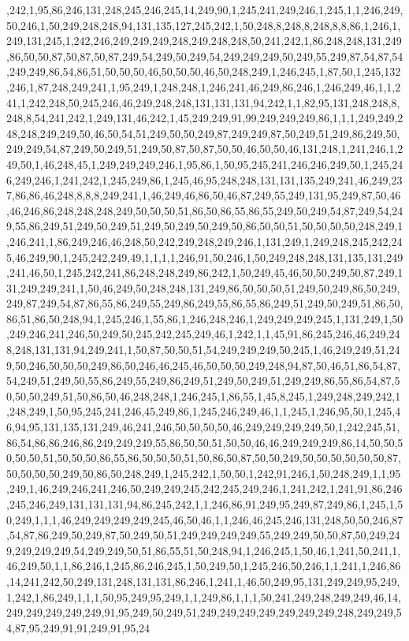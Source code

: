 ,242,1,95,86,246,131,248,245,246,245,14,249,90,1,245,241,249,246,1,245,1,1,246,249,50,246,1,50,249,248,248,94,131,135,127,245,242,1,50,248,8,248,8,248,8,8,86,1,246,1,249,131,245,1,242,246,249,249,249,248,249,248,248,50,241,242,1,86,248,248,131,249,86,50,50,87,50,87,50,87,249,54,249,50,249,54,249,249,249,50,249,55,249,87,54,87,54,249,249,86,54,86,51,50,50,50,46,50,50,50,46,50,248,249,1,246,245,1,87,50,1,245,132,246,1,87,248,249,241,1,95,249,1,248,248,1,246,241,46,249,86,246,1,246,249,46,1,1,241,1,242,248,50,245,246,46,249,248,248,131,131,131,94,242,1,1,82,95,131,248,248,8,248,8,54,241,242,1,249,131,46,242,1,45,249,249,91,99,249,249,249,86,1,1,1,249,249,248,248,249,249,50,46,50,54,51,249,50,50,249,87,249,249,87,50,249,51,249,86,249,50,249,249,54,87,249,50,249,51,249,50,87,50,87,50,50,46,50,50,46,131,248,1,241,246,1,249,50,1,46,248,45,1,249,249,249,246,1,95,86,1,50,95,245,241,246,246,249,50,1,245,246,249,246,1,241,242,1,245,249,86,1,245,46,95,248,248,131,131,135,249,241,46,249,237,86,86,46,248,8,8,8,249,241,1,46,249,46,86,50,46,87,249,55,249,131,95,249,87,50,46,46,246,86,248,248,248,249,50,50,50,51,86,50,86,55,86,55,249,50,249,54,87,249,54,249,55,86,249,51,249,50,249,51,249,50,249,50,249,50,86,50,50,51,50,50,50,50,248,249,1,246,241,1,86,249,246,46,248,50,242,249,248,249,246,1,131,249,1,249,248,245,242,245,46,249,90,1,245,242,249,49,1,1,1,1,246,91,50,246,1,50,249,248,248,131,135,131,249,241,46,50,1,245,242,241,86,248,248,249,86,242,1,50,249,45,46,50,50,249,50,87,249,131,249,249,241,1,50,46,249,50,248,248,131,249,86,50,50,50,51,249,50,249,86,50,249,249,87,249,54,87,86,55,86,249,55,249,86,249,55,86,55,86,249,51,249,50,249,51,86,50,86,51,86,50,248,94,1,245,246,1,55,86,1,246,248,246,1,249,249,249,245,1,131,249,1,50,249,246,241,246,50,249,50,245,242,245,249,46,1,242,1,1,45,91,86,245,246,46,249,248,248,131,131,94,249,241,1,50,87,50,50,51,54,249,249,249,50,245,1,46,249,249,51,249,50,246,50,50,50,249,86,50,246,46,245,46,50,50,50,249,248,94,87,50,46,51,86,54,87,54,249,51,249,50,55,86,249,55,249,86,249,51,249,50,249,51,249,249,86,55,86,54,87,50,50,50,249,51,50,86,50,46,248,248,1,246,245,1,86,55,1,45,8,245,1,249,248,249,242,1,248,249,1,50,95,245,241,246,45,249,86,1,245,246,249,46,1,1,245,1,246,95,50,1,245,46,94,95,131,135,131,249,46,241,246,50,50,50,50,46,249,249,249,249,50,1,242,245,51,86,54,86,86,246,86,249,249,249,55,86,50,50,51,50,50,46,46,249,249,249,86,14,50,50,50,50,50,51,50,50,50,86,55,86,50,50,50,51,50,86,50,87,50,50,249,50,50,50,50,50,50,87,50,50,50,50,249,50,86,50,248,249,1,245,242,1,50,50,1,242,91,246,1,50,248,249,1,1,95,249,1,46,249,246,241,246,50,249,249,245,242,245,249,246,1,241,242,1,241,91,86,246,245,246,249,131,131,131,94,86,245,242,1,1,246,86,91,249,95,249,87,249,86,1,245,1,50,249,1,1,1,46,249,249,249,249,245,46,50,46,1,1,246,46,245,246,131,248,50,50,246,87,54,87,86,249,50,249,87,50,249,50,51,249,249,249,249,55,249,249,50,50,87,50,249,249,249,249,249,54,249,249,50,51,86,55,51,50,248,94,1,246,245,1,50,46,1,241,50,241,1,46,249,50,1,1,86,246,1,245,86,246,245,1,50,249,50,1,245,246,50,246,1,1,241,1,246,86,14,241,242,50,249,131,248,131,131,86,246,1,241,1,46,50,249,95,131,249,249,95,249,1,242,1,86,249,1,1,1,50,95,249,95,249,1,1,249,86,1,1,1,50,241,249,248,249,249,46,14,249,249,249,249,249,91,95,249,50,249,51,249,249,249,249,249,249,249,248,249,249,54,87,95,249,91,91,249,91,95,24
